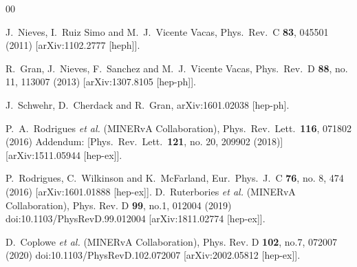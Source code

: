 \documentclass[aps,prl,twocolumn,superscriptaddress,nofootinbib]{revtex4}
\begin{document}
\begin{thebibliography}{00}
  
  J.~Nieves, I.~Ruiz Simo and M.~J.~Vicente Vacas,
  Phys.\ Rev.\ C {\bf 83}, 045501 (2011)
  [arXiv:1102.2777 [heph]].
  

  R.~Gran, J.~Nieves, F.~Sanchez and M.~J.~Vicente Vacas,
  Phys.\ Rev.\ D {\bf 88}, no. 11, 113007 (2013)
  [arXiv:1307.8105 [hep-ph]].
  
  J.~Schwehr, D.~Cherdack and R.~Gran,
  arXiv:1601.02038 [hep-ph].

  P.~A.~Rodrigues {\it et al.} (MINERvA Collaboration),
  Phys.\ Rev.\ Lett.\  {\bf 116}, 071802 (2016)
  Addendum: [Phys.\ Rev.\ Lett.\  {\bf 121}, no. 20, 209902 (2018)]
  [arXiv:1511.05944 [hep-ex]].

  P.~Rodrigues, C.~Wilkinson and K.~McFarland,
  Eur.\ Phys.\ J.\ C {\bf 76}, no. 8, 474 (2016)
  [arXiv:1601.01888 [hep-ex]].
D.~Ruterbories \textit{et al.} (MINERvA Collaboration),
Phys. Rev. D \textbf{99}, no.1, 012004 (2019)
doi:10.1103/PhysRevD.99.012004
[arXiv:1811.02774 [hep-ex]].


D.~Coplowe \textit{et al.} (MINERvA Collaboration),
Phys. Rev. D \textbf{102}, no.7, 072007 (2020)
doi:10.1103/PhysRevD.102.072007
[arXiv:2002.05812 [hep-ex]].


\end{thebibliography}
\end{document}
